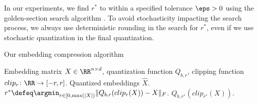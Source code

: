 In our experiments, we find $r^*$ to within a specified tolerance $\eps > 0$ using the golden-section search algorithm \citep{golden53}.
To avoid stochasticity impacting the search process, we always use deterministic rounding in the search for $r^*$, even if we use stochastic quantization in the final quantization.

\begin{algorithm}[tb]
   \caption{Our embedding compression algorithm}
   \label{alg:smallfry}
\begin{algorithmic}[1]
	  Embedding matrix $X \in \RR^{n \times d}$, quantization function $Q_{b,r}$, clipping function $clip_r\colon\RR\rightarrow[-r,r]$.
	 Quantized embeddings $\hat{X}$.
	\STATE $r^* \defeq \argmin_{r \in [0,\max(|X|)} \|Q_{b,r}(clip_r(X))-X\|_F$.
	 $Q_{b,r^*}(clip_{r^*}(X))$.
\end{algorithmic}
\end{algorithm}

